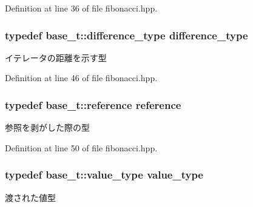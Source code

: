 \-Definition at line 36 of file fibonacci.\-hpp.

\hypertarget{classyuh_1_1range__detail_1_1fibonacci__iterator_a9ac6039762e1b262cecb98589ffc1d75}{
\subsubsection[{difference\-\_\-type}]{\setlength{\rightskip}{0pt plus 5cm}typedef base\-\_\-t\-::difference\-\_\-type {\bf difference\-\_\-type}}}\label{df/d65/classyuh_1_1range__detail_1_1fibonacci__iterator_a9ac6039762e1b262cecb98589ffc1d75}
イテレータの距離を示す型 

\-Definition at line 46 of file fibonacci.\-hpp.

\hypertarget{classyuh_1_1range__detail_1_1fibonacci__iterator_aa5d67140d1557795cc6c30a2849d4e05}{
\subsubsection[{reference}]{\setlength{\rightskip}{0pt plus 5cm}typedef base\-\_\-t\-::reference {\bf reference}}}\label{df/d65/classyuh_1_1range__detail_1_1fibonacci__iterator_aa5d67140d1557795cc6c30a2849d4e05}
参照を剥がした際の型 

\-Definition at line 50 of file fibonacci.\-hpp.

\hypertarget{classyuh_1_1range__detail_1_1fibonacci__iterator_ab7468d4ed49b58c84d6c1b71779fb43e}{
\subsubsection[{value\-\_\-type}]{\setlength{\rightskip}{0pt plus 5cm}typedef base\-\_\-t\-::value\-\_\-type {\bf value\-\_\-type}}}\label{df/d65/classyuh_1_1range__detail_1_1fibonacci__iterator_ab7468d4ed49b58c84d6c1b71779fb43e}
渡された値型 


